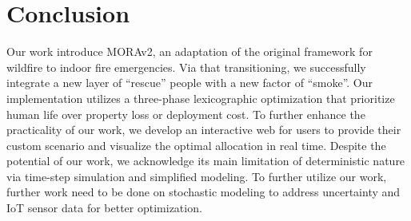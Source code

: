 \section{Conclusion}
\label{sec:conclusion}
Our work introduce MORAv2, an adaptation of the original framework for wildfire to indoor fire emergencies. 
Via that transitioning, we successfully integrate a new layer of ``rescue'' people with a new factor of ``smoke''. 
Our implementation utilizes a three-phase lexicographic optimization that prioritize human life over property loss or deployment cost. 
To further enhance the practicality of our work, we develop an interactive web for users to provide their custom scenario and visualize
the optimal allocation in real time. 
Despite the potential of our work, we acknowledge its main limitation of deterministic nature via time-step simulation and 
simplified modeling. To further utilize our work, further work need to be done on stochastic modeling to address uncertainty and 
IoT sensor data for better optimization.  